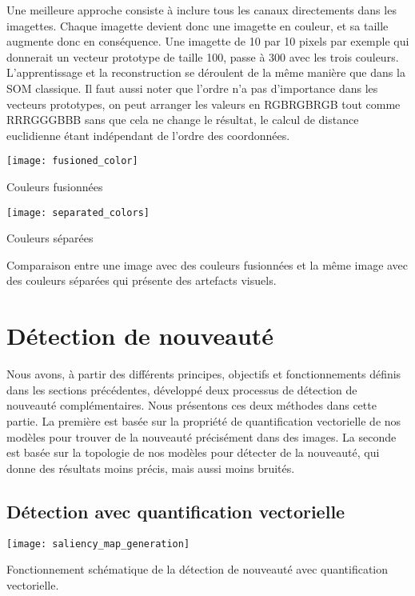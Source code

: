 	Une meilleure approche consiste à inclure tous les canaux directements dans les imagettes. Chaque imagette devient donc une imagette en couleur, et sa taille augmente donc en conséquence. Une imagette de 10 par 10 pixels par exemple qui donnerait un vecteur prototype de taille 100, passe à 300 avec les trois couleurs. L'apprentissage et la reconstruction se déroulent de la même manière que dans la SOM classique. Il faut aussi noter que l'ordre n'a pas d'importance dans les vecteurs prototypes, on peut arranger les valeurs en RGBRGBRGB tout comme RRRGGGBBB sans que cela ne change le résultat, le calcul de distance euclidienne étant indépendant de l'ordre des coordonnées.

	\begin{figureth}
		\begin{subfigureth}{0.48\textwidth}
			\texttt{[image: fusioned\_color]}\caption{Couleurs fusionnées}	
		\end{subfigureth}
		\begin{subfigureth}{0.48\textwidth}
			\texttt{[image: separated\_colors]}\caption{Couleurs séparées}	
		\end{subfigureth}
		\caption[Représentation d'une image]{Comparaison entre une image avec des couleurs fusionnées et la même image avec des couleurs séparées qui présente des artefacts visuels.}\label{fig:img:rep}
	\end{figureth}

	\newpage
	\section{Détection de nouveauté}

	Nous avons, à partir des différents principes, objectifs et fonctionnements définis dans les sections précédentes, développé deux processus de détection de nouveauté complémentaires. Nous présentons ces deux méthodes dans cette partie. La première est basée sur la propriété de quantification vectorielle de nos modèles pour trouver de la nouveauté précisément dans des images. La seconde est basée sur la topologie de nos modèles pour détecter de la nouveauté, qui donne des résultats moins précis, mais aussi moins bruités.

	\subsection{Détection avec quantification vectorielle}

	\begin{figureth}
		\texttt{[image: saliency\_map\_generation]}
		\caption[Détection de nouveauté avec QV]{Fonctionnement schématique de la détection de nouveauté avec quantification vectorielle.}\label{fig:img:vq}
	\end{figureth}

